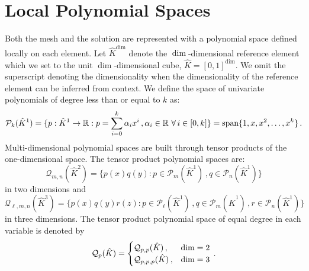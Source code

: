 \documentclass[../doc.tex]{subfiles}
\begin{document}
\section{Local Polynomial Spaces}
Both the mesh and the solution are represented with a polynomial space defined locally on each element. Let $\hat{K}^{\dim}$ denote the $\dim$-dimensional reference element which we set to the unit $\dim$-dimensional cube, $\hat{K} = [0,1]^{\dim}$. We omit the superscript denoting the dimensionality when the dimensionality of the reference element can be inferred from context. We define the space of univariate polynomials of degree less than or equal to $k$ as: 
	\begin{equation}
		\mathcal{P}_k(\hat{K}^1) = \{ p : \hat{K}^1 \rightarrow \mathbb{R} : p = \sum_{i=0}^{k} \alpha_i x^i \,, \alpha_i \in \mathbb{R}\ \forall\,i \in [0,k]\} = \operatorname{span}\{ 1, x, x^2, \ldots, x^k \} \,. 
	\end{equation}
Multi-dimensional polynomial spaces are built through tensor products of the one-dimensional space. The tensor product polynomial spaces are:  
	\begin{equation}
		\mathcal{Q}_{m,n}(\hat{K}^2) = \{ p(x) q(y) : p \in \mathcal{P}_{m}(\hat{K}^1)\,, q \in \mathcal{P}_{n}(\hat{K}^1) \} 
	\end{equation}
in two dimensions and 
	\begin{equation}
		\mathcal{Q}_{\ell,m,n}(\hat{K}^3) = \{ p(x) q(y) r(z) : p \in \mathcal{P}_{\ell}(\hat{K}^1)\,, q \in \mathcal{P}_{m}(\hat{K}^1)\,, r \in \mathcal{P}_{n}(\hat{K}^1)\} 
	\end{equation}
in three dimensions. 
The tensor product polynomial space of equal degree in each variable is denoted by 
	\begin{equation}
		\mathcal{Q}_{p}(\hat{K}) = \begin{cases}
			\mathcal{Q}_{p,p}(\hat{K}) \,, & \dim = 2 \\ 
			\mathcal{Q}_{p,p,p}(\hat{K}) \,, & \dim = 3 
		\end{cases} \,. 
	\end{equation}
\end{document}
